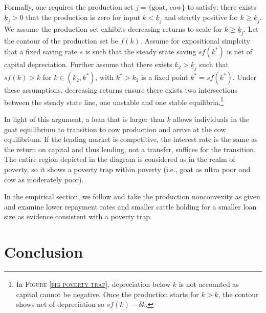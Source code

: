 	Formally, one requires the production set $j=\{\mbox{goat, cow}\}$ to satisfy: there exists $\underline{k}_{j}>0$ that the production is zero for input $k<\underline{k}_{j}$ and strictly positive for $k\geqslant\underline{k}_{j}$. We assume the production set exhibits decreasing returns to scale for $k\geqslant\underline{k}_{j}$. Let the contour of the production set be $f(k)$. Assume for expositional simplcity that a fixed saving rate $s$ is such that the steady state saving $sf(k^{*})$ is net of capital depreciation. Further assume that there exists $k_{2}>\underline{k}_{j}$ such that $sf(k)>k$ for $k\in(k_{2}, k^{*})$, with $k^{*}>k_{2}$ is a fixed point $k^{*}=sf(k^{*})$. Under these assumptions, decreasing returns ensure there exists two intersections between the steady state line, one unstable and one stable equilibria.\footnote{In \textsc{Figure \ref{fig poverty trap}}, depreciation below $\underline{k}$ is not accounted as capital cannot be negative. Once the production starts for $k>\underline{k}$, the contour shows net of depreciation so $sf(k)-\delta k$. } 

	In light of this argument, a loan that is larger than $\underline{k}$ allows individuals in the goat equilibrium to transition to cow production and arrive at the cow equilibrium. If the lending market is competitive, the interest rate is the same as the return on capital and thus lending, not a transfer, suffices for the transition. The entire region depicted in the diagram is considered as in the realm of poverty, so it shows a poverty trap within poverty (i.e., goat as ultra poor and cow as moderately poor). 

	In the empirical section, we follow \citet{BandieraBRAC2017} and take the production nonconvexity as given and examine lower repayment rates and smaller cattle holding for a smaller loan size as evidence consistent with a poverty trap. 

\section{Conclusion}
\label{SecConclusion}

